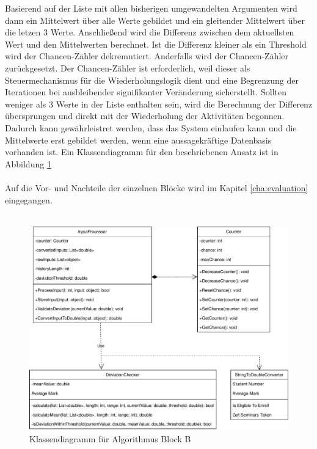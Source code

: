     Basierend auf der Liste mit allen bisherigen umgewandelten Argumenten wird dann ein Mittelwert über alle Werte gebildet und ein gleitender Mittelwert über die letzen 3 Werte.
    Anschließend wird die Differenz zwischen dem aktuellsten Wert und den Mittelwerten berechnet. 
    Ist die Differenz kleiner als ein Threshold wird der Chancen-Zähler dekremntiert. 
    Anderfalls wird der Chancen-Zähler zurückgesetzt.
    Der Chancen-Zähler ist erforderlich, weil dieser als Steuermechanismus für die Wiederholungslogik dient und eine Begrenzung der Iterationen bei ausbleibender signifikanter Veränderung sicherstellt.
    Sollten weniger als 3 Werte in der Liste enthalten sein, wird die Berechnung der Differenz übersprungen und direkt mit der Wiederholung der Aktivitäten begonnen.
    Dadurch kann gewährleistret werden, dass das System einlaufen kann und die Mittelwerte erst gebildet werden, wenn eine aussagekräftige Datenbasis vorhanden ist.
    Ein Klassendiagramm für den beschriebenen Ansatz ist in Abbildung \cref{fig:klassendiagramm-blockb}\\
    \\
    Auf die Vor- und Nachteile der einzelnen Blöcke wird im Kapitel \cref{cha:evaluation} eingegangen.\\
    \\
    \begin{figure}[H]
        \centering
        \includegraphics[width=\textwidth]{./images/klassendiagramm-blockb.pdf}        
        \caption{Klassendiagramm für Algorithmus Block B}
        \label{fig:klassendiagramm-blockb}
    \end{figure}
